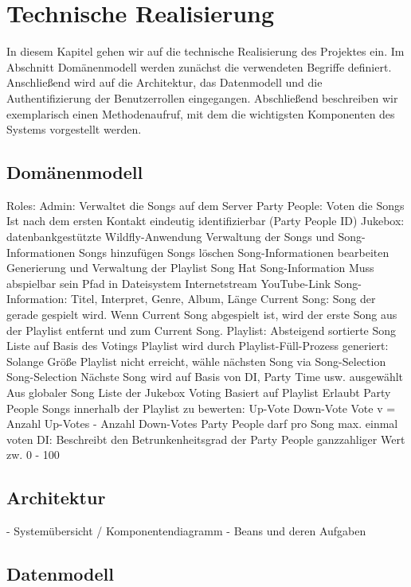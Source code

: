 \section{Technische Realisierung}
In diesem Kapitel gehen wir auf die technische Realisierung des Projektes ein. Im Abschnitt Domänenmodell werden zunächst die verwendeten Begriffe definiert. Anschließend wird auf die Architektur, das Datenmodell und die Authentifizierung der Benutzerrollen eingegangen. Abschließend beschreiben wir exemplarisch einen Methodenaufruf, mit dem die wichtigsten Komponenten des Systems vorgestellt werden.

\subsection{Domänenmodell}


Roles:
Admin: 
Verwaltet die Songs auf dem Server
Party People:
Voten die Songs
Ist nach dem ersten Kontakt eindeutig identifizierbar (Party People ID)
Jukebox: datenbankgestützte Wildfly-Anwendung
Verwaltung der Songs und Song-Informationen
Songs hinzufügen
Songs löschen 
Song-Informationen bearbeiten
Generierung und Verwaltung der Playlist
Song
Hat Song-Information
Muss abspielbar sein
Pfad in Dateisystem
Internetstream
YouTube-Link
Song-Information:
Titel, Interpret, Genre, Album, Länge
Current Song:
Song der gerade gespielt wird.
Wenn Current Song abgespielt ist, wird der erste Song aus der Playlist entfernt und zum Current Song.
Playlist:
Absteigend sortierte Song Liste auf Basis des Votings
Playlist wird durch Playlist-Füll-Prozess generiert:
Solange Größe Playlist nicht erreicht, wähle nächsten Song via Song-Selection
Song-Selection
Nächste Song wird auf Basis von DI, Party Time usw. ausgewählt
Aus globaler Song Liste der Jukebox
Voting
Basiert auf Playlist
Erlaubt Party People Songs innerhalb der Playlist zu bewerten:
Up-Vote
Down-Vote
Vote v = Anzahl Up-Votes - Anzahl Down-Votes
Party People darf pro Song max. einmal voten
DI:
Beschreibt den Betrunkenheitsgrad der Party People
ganzzahliger Wert zw. 0 - 100


\subsection{Architektur}


- Systemübersicht / Komponentendiagramm
- Beans und deren Aufgaben


\subsection{Datenmodell}

